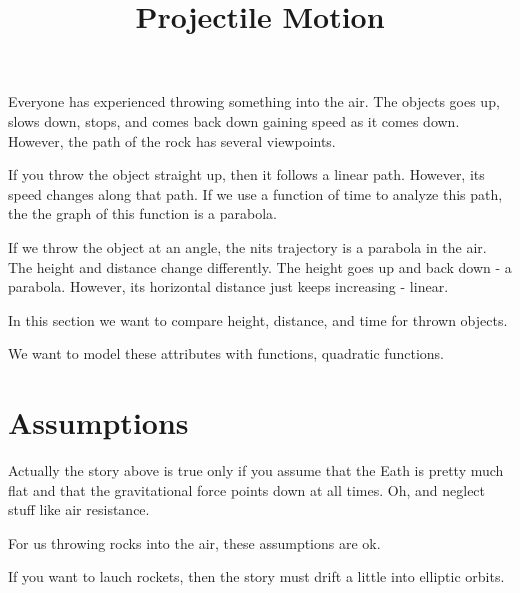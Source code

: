 \documentclass{ximera}
\title{Projectile Motion}
\begin{document}
\begin{abstract}
\end{abstract}
\maketitle



Everyone has experienced throwing something into the air. The objects goes up, slows down, stops, and comes back down gaining speed as it comes down.  However, the path of the rock has several viewpoints.

If you throw the object straight up, then it follows a linear path.  However, its speed changes along that path.  If we use a function of time to analyze this path, the the graph of this function is a parabola.

If we throw the object at an angle, the nits trajectory is a parabola in the air.  The height and distance change differently.  The height goes up and back down - a parabola.  However, its horizontal distance just keeps increasing - linear.

In this section we want to compare height, distance, and time for thrown objects.

We want to model these attributes with functions, quadratic functions.



\section{Assumptions}

Actually the story above is true only if you assume that the Eath is pretty much flat and that the gravitational force points down at all times. Oh, and neglect stuff like air resistance.


For us throwing rocks into the air, these assumptions are ok.

If you want to lauch rockets, then the story must drift a little into elliptic orbits.  
\end{document}
